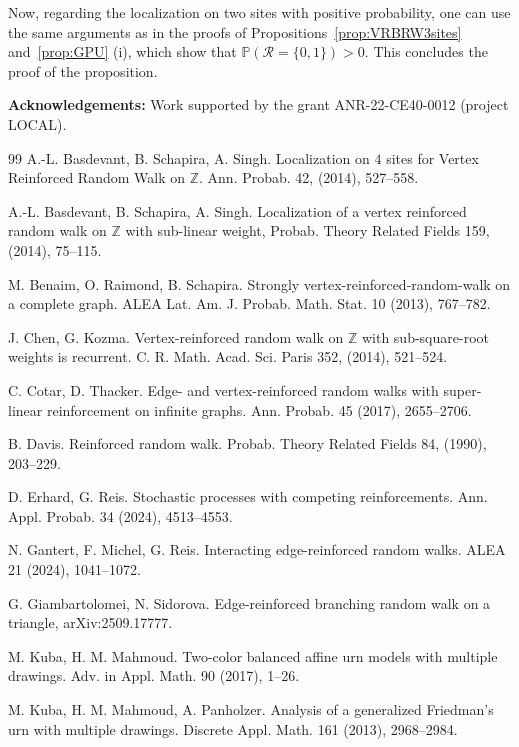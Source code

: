 \documentclass[11pt]{article}
\newcommand{\1}{{\text{\Large $\mathfrak 1$}}}
\begin{document}
Now, regarding the localization on two sites with positive probability, one can use the same arguments as in the proofs of Propositions~\ref{prop:VRBRW3sites} and~\ref{prop:GPU} (i), which show that 
$\mathbb P(\mathcal R = \{0,1\})>0$. 
This concludes the proof of the proposition. 

\vspace{0.2cm}
\textbf{Acknowledgements:} Work supported by the grant ANR-22-CE40-0012 (project LOCAL).

\begin{thebibliography}{99}
 A.-L. Basdevant, B. Schapira, A. Singh. Localization on $4$ sites for Vertex Reinforced Random Walk on $\mathbb Z$. Ann. Probab. 42, (2014), 527--558. 

 A.-L. Basdevant, B. Schapira, A. Singh. Localization of a vertex reinforced random
walk on $\mathbb Z$ with sub-linear weight, Probab. Theory Related Fields 159, (2014), 75--115.

 M. Benaim, O. Raimond, B. Schapira. Strongly vertex-reinforced-random-walk on a complete graph. 
ALEA Lat. Am. J. Probab. Math. Stat. 10 (2013), 767--782.

 J. Chen, G. Kozma. Vertex-reinforced random walk on $\mathbb Z$ with sub-square-root weights is recurrent.
C. R. Math. Acad. Sci. Paris 352, (2014), 521--524.

 C. Cotar, D. Thacker. Edge- and vertex-reinforced random walks with super-linear reinforcement on infinite graphs. Ann. Probab. 45 (2017), 2655--2706. 

 B. Davis. Reinforced random walk. Probab. Theory Related Fields 84, (1990), 203--229.

 D. Erhard, G. Reis. Stochastic processes with competing reinforcements. Ann. Appl. Probab. 34 (2024), 4513--4553.

 N. Gantert, F. Michel, G. Reis.  Interacting edge-reinforced random walks. ALEA 21 (2024), 1041--1072.

 G. Giambartolomei, N. Sidorova. Edge-reinforced branching random walk on a triangle, arXiv:2509.17777. 

 M. Kuba, H. M. Mahmoud. Two-color balanced affine urn models with multiple drawings. 
Adv. in Appl. Math. 90 (2017), 1--26.

 M. Kuba, H. M. Mahmoud, A. Panholzer. Analysis of a generalized Friedman's urn with multiple drawings. Discrete Appl. Math. 161 (2013), 2968--2984.


\end{thebibliography}
\end{document}
